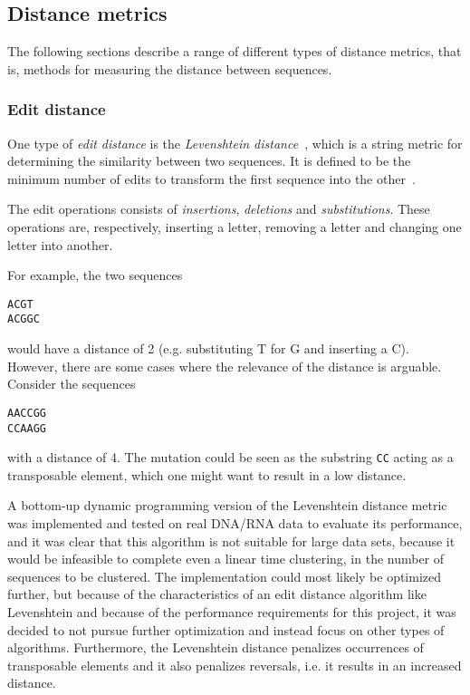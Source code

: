 \subsection{Distance metrics}

The following sections describe a range of different types of distance metrics,
that is, methods for measuring the distance between sequences.

\subsubsection{Edit distance}\label{sec:edit_distance}

One type of \emph{edit distance} is the \emph{Levenshtein
distance}~\cite{levenshtein}, which is a string metric for determining the
similarity between two sequences. It is defined to be the minimum number of
edits to transform the first sequence into the other~\cite[p.~52]{dong}.

The edit operations consists of \emph{insertions}, \emph{deletions} and
\emph{substitutions}. These operations are, respectively, inserting a letter,
removing a letter and changing one letter into another.

For example, the two sequences
\begin{center}
  \texttt{ACGT} \\
  \texttt{ACGGC}
\end{center}
would have a distance of 2 (e.g. substituting T for G and inserting a C).
However, there are some cases where the relevance of the distance is arguable.
Consider the sequences
\begin{center}
  \texttt{AACCGG} \\
  \texttt{CCAAGG}
\end{center}
with a distance of 4. The mutation could be seen as the substring \texttt{CC}
acting as a transposable element, which one might want to result in a low
distance.

A bottom-up dynamic programming version of the Levenshtein distance metric was
implemented and tested on real DNA/RNA data to evaluate its performance, and it
was clear that this algorithm is not suitable for large data sets, because it
would be infeasible to complete even a linear time clustering, in the number of
sequences to be clustered. The implementation could most likely be optimized
further, but because of the characteristics of an edit distance algorithm like
Levenshtein and because of the performance requirements for this project, it
was decided to not pursue further optimization and instead focus on other types
of algorithms. Furthermore, the Levenshtein distance penalizes occurrences of
transposable elements and it also penalizes reversals, i.e. it results in an
increased distance.

